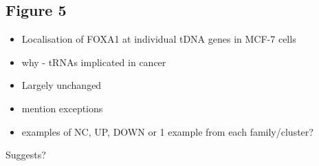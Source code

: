 \documentclass[
  12pt,
]{article}
\providecommand{\tightlist}{%
  \setlength{\itemsep}{0pt}\setlength{\parskip}{0pt}}
\begin{document}
\hypertarget{figure-5}{%
\subsection{Figure 5}\label{figure-5}}

\begin{itemize}
\tightlist
\item
  Localisation of FOXA1 at individual tDNA genes in MCF-7 cells
\item
  why - tRNAs implicated in cancer
\item
  Largely unchanged
\item
  mention exceptions
\item
  examples of NC, UP, DOWN or 1 example from each family/cluster?
\end{itemize}

Suggests?
\end{document}
